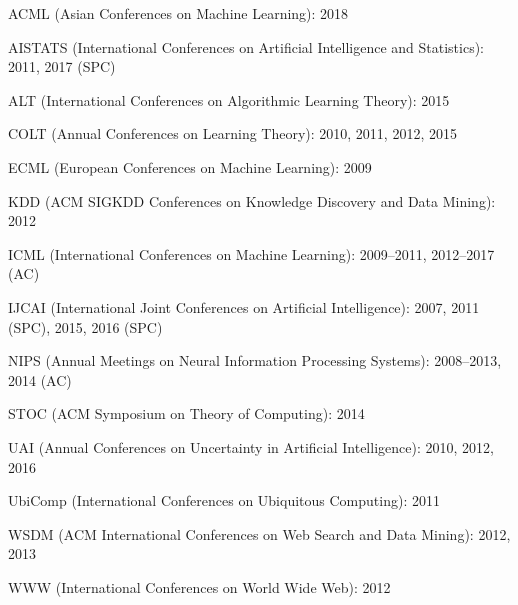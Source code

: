 \documentclass[10pt,twoside,letterpaper]{article}
\newcommand{\negitemspace}{\vspace{1mm}}
\begin{document}
\begin{compactitem}
\begin{compactitem}
\item{ACML (Asian Conferences on Machine Learning): 2018}

\item{AISTATS (International Conferences on Artificial Intelligence and Statistics): 2011, 2017 (SPC)}

\item{ALT (International Conferences on Algorithmic Learning Theory): 2015}

\item{COLT (Annual Conferences on Learning Theory): 2010, 2011, 2012, 2015}

\item{ECML (European Conferences on Machine Learning): 2009}

\item{KDD (ACM SIGKDD Conferences on Knowledge Discovery and Data Mining): 2012}

\item{ICML (International Conferences on Machine Learning): 2009--2011, 2012--2017 (AC)}

\item{IJCAI (International Joint Conferences on Artificial Intelligence): 2007, 2011 (SPC), 2015, 2016 (SPC)}

\item{NIPS (Annual Meetings on Neural Information Processing Systems): 2008--2013, 2014 (AC)}

\item{STOC (ACM Symposium on Theory of Computing): 2014}

\item{UAI (Annual Conferences on Uncertainty in Artificial
Intelligence): 2010, 2012, 2016}

\item{UbiComp (International Conferences on Ubiquitous Computing): 2011}

\item{WSDM (ACM International Conferences on Web Search and Data Mining): 2012, 2013}

\item{WWW (International Conferences on World Wide Web): 2012}

\end{compactitem} \negitemspace



\end{compactitem}
\end{document}
